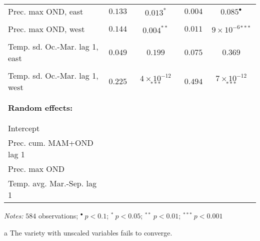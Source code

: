 \documentclass[a4paper,12pt]{article}
\begin{document}
{\begin{threeparttable}
\begin{small}
\begin{tabular}{lrccc}
      \vspace{-0.2cm}Prec. max OND, east&$0.133$&$0.013^{*}$&$0.004$&$0.085^{\bullet}$\\
  \\
        \vspace{-0.2cm}Prec. max OND, west&$0.144$&$0.004^{**}$&$0.011$&$9\times10^{-6}$$^{***}$\\
  \\
    \vspace{-0.2cm}Temp. sd. Oc.-Mar. lag 1, east&$0.049$&$0.199$&$0.075$&$0.369$\\
  \\
      Temp. sd. Oc.-Mar. lag 1, west&$0.225$& $4\times10^{-12}$ $^{***}$&$0.494$&$7\times10^{-12}$ $^{***}$\\
    \vspace{-0.1cm} \\ 
  \hline
  
\vspace{-0.1cm}\\\multicolumn{1}{l}{\textbf{Random effects:}}  & \\ 
\\\hline \vspace{-0.1cm} \\

\vspace{0.2cm}Intercept\\
\vspace{0.2cm}Prec. cum. MAM+OND lag 1\\
\vspace{0.2cm}Prec. max OND\\
\vspace{0.2cm}Temp. avg. Mar.-Sep. lag 1
  \\
  \hline
\end{tabular} 
\end{small}
 \begin{tablenotes}
  \begin{footnotesize}
    \item \textit{Notes:} \hspace{0.15cm}$584$ observations; \hspace{0.45cm}$^{\bullet}~p<0.1$; $^{*}~p<0.05$; $^{**}~p<0.01$; $^{***}~p<0.001$
    \begin{adjustwidth}{1cm}{} 
    \item[a] The variety with unscaled variables fails to converge.
     \end{adjustwidth}
\singlespacing
  \end{footnotesize}
\end{tablenotes}
  \end{threeparttable} 
\par}
\linespread{1}
\end{document}
